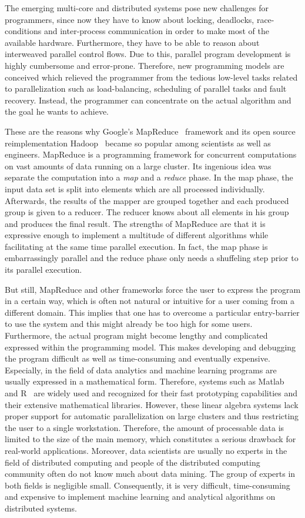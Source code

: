 The emerging multi-core and distributed systems pose new challenges for programmers, since now they have to know about locking, deadlocks, race-conditions and inter-process communication in order to make most of the available hardware.
Furthermore, they have to be able to reason about interweaved parallel control flows.
Due to this, parallel program development is highly cumbersome and error-prone.
Therefore, new programming models are conceived which relieved the programmer from the tedious low-level tasks related to parallelization such as load-balancing, scheduling of parallel tasks and fault recovery.
Instead, the programmer can concentrate on the actual algorithm and the goal he wants to achieve.

These are the reasons why Google's MapReduce~\cite{dean:c2008a} framework and its open source reimplementation Hadoop~\cite{hadoop:2008a} became so popular among scientists as well as engineers.
MapReduce is a programming framework for concurrent computations on vast amounts of data running on a large cluster.
Its ingenious idea was separate the computation into a \emph{map} and a \emph{reduce} phase.
In the map phase, the input data set is split into elements which are all processed individually.
Afterwards, the results of the mapper are grouped together and each produced group is given to a reducer.
The reducer knows about all elements in his group and produces the final result.
The strengths of MapReduce are that it is expressive enough to implement a multitude of different algorithms while facilitating at the same time parallel execution.
In fact, the map phase is embarrassingly parallel and the reduce phase only needs a shuffeling step prior to its parallel execution.

But still, MapReduce and other frameworks force the user to express the program in a certain way, which is often not natural or intuitive for a user coming from a different domain.
This implies that one has to overcome a particular entry-barrier to use the system and this might already be too high for some users.
Furthermore, the actual program might become lengthy and complicated expressed within the programming model.
This makes developing and debugging the program difficult as well as time-consuming and eventually expensive.
Especially, in the field of data analytics and machine learning programs are usually expressed in a mathematical form.
Therefore, systems such as Matlab~\cite{matlab} and R~\cite{r:1993a} are widely used and recognized for their fast prototyping capabilities and their extensive mathematical libraries.
However, these linear algebra systems lack proper support for automatic parallelization on large clusters and thus restricting the user to a single workstation.
Therefore, the amount of processable data is limited to the size of the main memory, which constitutes a serious drawback for real-world applications.
Moreover, data scientists are usually no experts in the field of distributed computing and people of the distributed computing community often do not know much about data mining.
The group of experts in both fields is negligible small.
Consequently, it is very difficult, time-consuming and expensive to implement machine learning and analytical algorithms on distributed systems.

